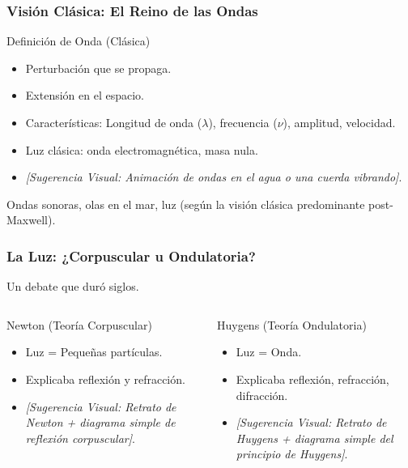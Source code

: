 \documentclass{beamer}
\begin{document}
	\begin{frame}
		\frametitle{Visión Clásica: El Reino de las Ondas}
		\begin{block}{Definición de Onda (Clásica)}
			\begin{itemize}
				\item Perturbación que se propaga.
				\item Extensión en el espacio.
				\item Características: Longitud de onda ($\lambda$), frecuencia ($\nu$), amplitud, velocidad.
				\item Luz clásica: onda electromagnética, masa nula.
				\item \textit{[Sugerencia Visual: Animación de ondas en el agua o una cuerda vibrando]}.
			\end{itemize}
		\end{block}
		\pause
		\begin{examples}
			Ondas sonoras, olas en el mar, luz (según la visión clásica predominante post-Maxwell).
		\end{examples}
	\end{frame}
	
	\begin{frame}
		\frametitle{La Luz: ¿Corpuscular u Ondulatoria?}
		Un debate que duró siglos.
		\pause
		\begin{columns}[T] %
			\begin{column}{0.5\textwidth}
				\begin{block}{Newton (Teoría Corpuscular)}
					\begin{itemize}
						\item Luz = Pequeñas partículas.
						\item Explicaba reflexión y refracción.
						\item \textit{[Sugerencia Visual: Retrato de Newton + diagrama simple de reflexión corpuscular]}.
					\end{itemize}
				\end{block}
			\end{column}
			\begin{column}{0.5\textwidth}
				\begin{block}{Huygens (Teoría Ondulatoria)}
					\begin{itemize}
						\item Luz = Onda.
						\item Explicaba reflexión, refracción, difracción.
						\item \textit{[Sugerencia Visual: Retrato de Huygens + diagrama simple del principio de Huygens]}.
					\end{itemize}
				\end{block}
			\end{column}
		\end{columns}
	\end{frame}
	
\end{document}
